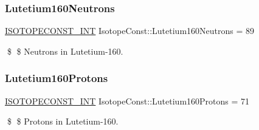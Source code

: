 \subsubsection{\texorpdfstring{Lutetium160\+Neutrons}{Lutetium160Neutrons}}
{\footnotesize\ttfamily \mbox{\hyperlink{group___isotope_const-_macros_ga5f18360b3e99483a35c32d789e62621c}{I\+S\+O\+T\+O\+P\+E\+C\+O\+N\+S\+T\+\_\+\+I\+NT}} Isotope\+Const\+::\+Lutetium160\+Neutrons = 89}

\$ \$ Neutrons in Lutetium-\/160. \mbox{\label{group___isotope_const-_lutetium-_lu160_ga33a0db0c80aa9b34fc4c81ed956a0b57}} 
\subsubsection{\texorpdfstring{Lutetium160\+Protons}{Lutetium160Protons}}
{\footnotesize\ttfamily \mbox{\hyperlink{group___isotope_const-_macros_ga5f18360b3e99483a35c32d789e62621c}{I\+S\+O\+T\+O\+P\+E\+C\+O\+N\+S\+T\+\_\+\+I\+NT}} Isotope\+Const\+::\+Lutetium160\+Protons = 71}

\$ \$ Protons in Lutetium-\/160. 